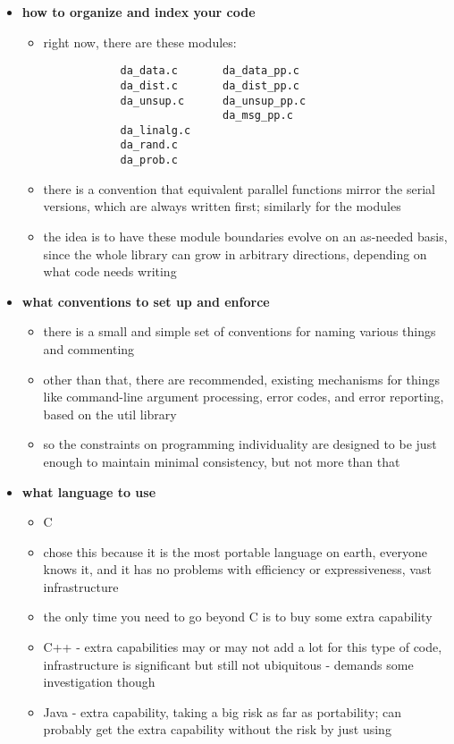 \begin{itemize}
\item {\bf how to organize and index your code}
	\begin{itemize}
	\item right now, there are these modules:
		\begin{verbatim}
			da_data.c       da_data_pp.c
			da_dist.c       da_dist_pp.c
			da_unsup.c      da_unsup_pp.c
			                da_msg_pp.c
			da_linalg.c
			da_rand.c
			da_prob.c
		\end{verbatim}
	\item there is a convention that equivalent parallel functions mirror the
			serial versions, which are always written first; similarly for the
			modules
	\item the idea is to have these module boundaries evolve on an as-needed
			basis, since the whole library can grow in arbitrary directions,
			depending on what code needs writing
	\end{itemize}
\item {\bf what conventions to set up and enforce}
	\begin{itemize}
	\item there is a small and simple set of conventions for naming various
			things and commenting
	\item other than that, there are recommended, existing mechanisms for 
			things like command-line argument processing, error codes, and
			error reporting, based on the util library
	\item so the constraints on programming individuality are designed to be just
			enough to maintain minimal consistency, but not more than that
	\end{itemize}
\item {\bf what language to use}
	\begin{itemize}
	\item C
	\item chose this because it is the most portable language on earth, everyone
			knows it, and it has no problems with efficiency or expressiveness,
			vast infrastructure
	\item the only time you need to go beyond C is to buy some extra capability
	\item C++ - extra capabilities may or may not add a lot for this type of code,
			infrastructure is significant but still not ubiquitous - demands
			some investigation though
	\item Java - extra capability, taking a big risk as far as portability;
			can probably get the extra capability without the risk by just using

\end{itemize}
\end{itemize}
